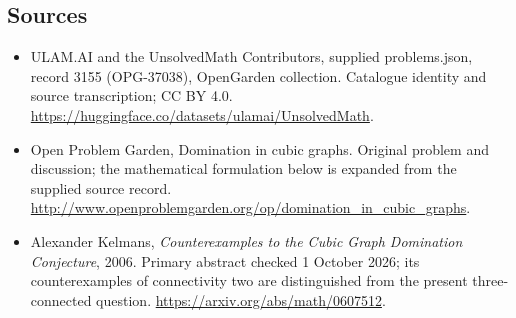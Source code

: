 \documentclass[11pt,a4paper]{article}
\begin{document}
\subsection{Sources}
\begin{itemize}
\item[S1] ULAM.AI and the UnsolvedMath Contributors, supplied problems.json, record 3155 (OPG-37038), OpenGarden collection. Catalogue identity and source transcription; CC BY 4.0.
\url{https://huggingface.co/datasets/ulamai/UnsolvedMath}.
\item[S2] Open Problem Garden, Domination in cubic graphs. Original problem and discussion; the mathematical formulation below is expanded from the supplied source record.
\url{http://www.openproblemgarden.org/op/domination_in_cubic_graphs}.

\item[R1] Alexander Kelmans, \emph{Counterexamples to the Cubic Graph
Domination Conjecture}, 2006. Primary abstract checked 1 October 2026;
its counterexamples of connectivity two are distinguished from the
present three-connected question.
\url{https://arxiv.org/abs/math/0607512}.

\end{itemize}
\end{document}
